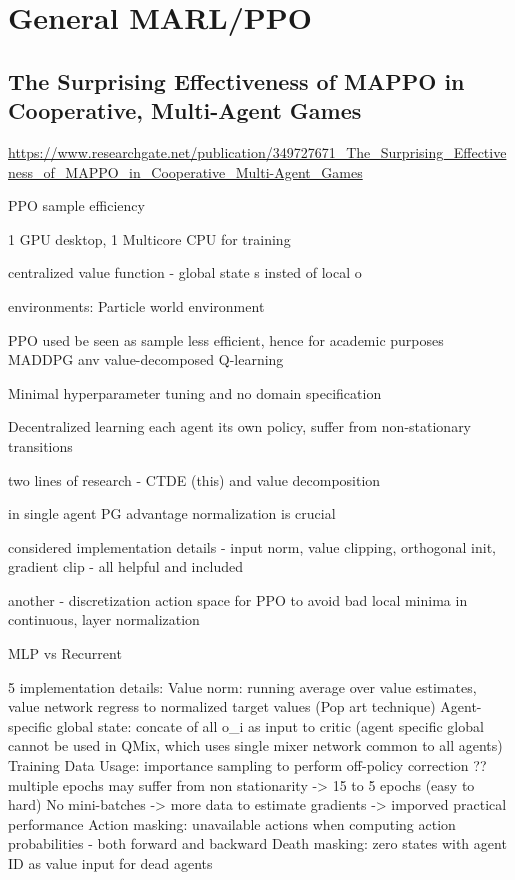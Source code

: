 \documentclass{report}
\begin{document}
\chapter{General MARL/PPO}

\section{The Surprising Effectiveness of MAPPO in Cooperative, Multi-Agent Games}
\url{https://www.researchgate.net/publication/349727671_The_Surprising_Effectiveness_of_MAPPO_in_Cooperative_Multi-Agent_Games}

\begin{list}{}{}
    \item PPO sample efficiency
    \item 1 GPU desktop, 1 Multicore CPU for training
    \item centralized value function - global state s insted of local o
    \item environments: Particle world environment
    \item PPO used be seen as sample less efficient, hence for academic purposes MADDPG anv value-decomposed Q-learning
    \item Minimal hyperparameter tuning and no domain specification
    \item Decentralized learning each agent its own policy, suffer from non-stationary transitions
    \item two lines of research - CTDE (this) and value decomposition
    \item in single agent PG advantage normalization is crucial
    \item considered implementation details - input norm, value clipping, orthogonal init, gradient clip - all helpful and included
    \item another - discretization action space for PPO to avoid bad local minima in continuous, layer normalization
    \item MLP vs Recurrent
    \item 5 implementation details: \newline
        Value norm: running average over value estimates, value network regress to normalized target values (Pop art technique) \newline
        Agent-specific global state: concate of all o\_i as input to critic  \newline
        (agent specific global cannot be used in QMix, which uses single mixer network common to all agents) \newline
        Training Data Usage: importance sampling to perform off-policy correction ?? \newline
            multiple epochs may suffer from non stationarity -> 15 to 5 epochs (easy to hard) \newline
            No mini-batches -> more data to estimate gradients -> imporved practical performance \newline
        Action masking: unavailable actions when computing action probabilities - both forward and backward \newline
        Death masking: zero states with agent ID as value input for dead agents        


\end{list}
\end{document}
